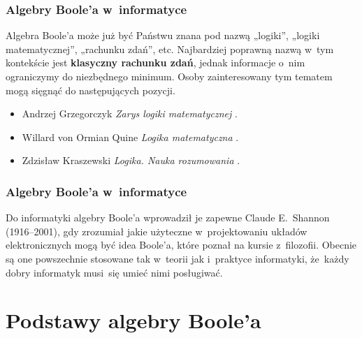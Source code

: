 \documentclass[10pt,t]{beamer}
\begin{document}
\begin{frame}
  \frametitle{Algebry Boole’a w~informatyce}


  Algebra Boole’a może już być Państwu znana pod nazwą „logiki”,
  „logiki matematycznej”, „rachunku zdań”, etc. Najbardziej poprawną
  nazwą w~tym kontekście jest \textbf{klasyczny rachunku zdań}, jednak
  informacje o~nim ograniczymy do niezbędnego minimum. Osoby zainteresowany
  tym tematem mogą sięgnąć do następujących pozycji.
  \begin{itemize}

  \item Andrzej Grzegorczyk \textit{Zarys logiki matematycznej}
    \parencite{Grzegorczyk-Zarys-logiki-matematycznej-Pub-1975}.



  \item Willard von Ormian Quine \textit{Logika matematyczna}
    \parencite{Quine-Logika-matematyczna-Pub-1974}.



  \item Zdzisław Kraszewski \textit{Logika. Nauka rozumowania}
    \parencite{Kraszewski-Logika-Pub-1984}.

  \end{itemize}

\end{frame}





\begin{frame}
  \frametitle{Algebry Boole’a w~informatyce}


  Do informatyki algebry Boole’a wprowadził je zapewne Claude E.~Shannon
  (1916--2001), gdy zrozumiał jakie użyteczne w~projektowaniu układów
  elektronicznych mogą być idea Boole’a, które poznał na kursie
  z~filozofii. Obecnie są one powszechnie stosowane tak w~teorii jak
  i~praktyce informatyki, że~każdy dobry informatyk musi~się umieć nimi
  posługiwać.

\end{frame}










\section{Podstawy algebry Boole’a}
\end{document}
